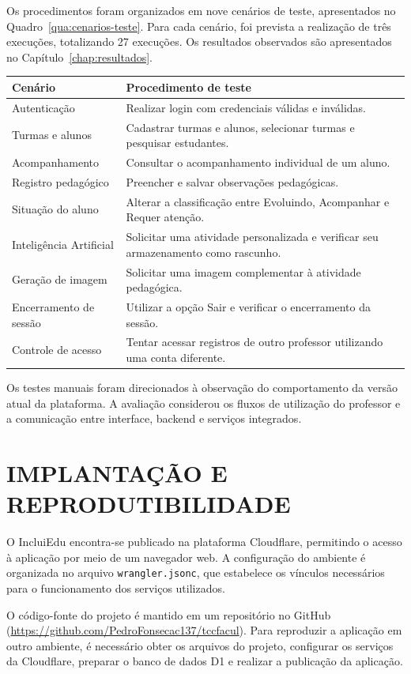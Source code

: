 Os procedimentos foram organizados em nove cenários de teste, apresentados no Quadro~\ref{qua:cenarios-teste}. Para cada cenário, foi prevista a realização de três execuções, totalizando 27 execuções. Os resultados observados são apresentados no Capítulo~\ref{chap:resultados}.

\begin{quadro}[H]
\centering
\caption{Planejamento dos cenários de teste}
\label{qua:cenarios-teste}
\begin{tabular}{|l|p{10cm}|}
\hline
\textbf{Cenário} & \textbf{Procedimento de teste} \\
\hline
Autenticação & Realizar login com credenciais válidas e inválidas. \\
\hline
Turmas e alunos & Cadastrar turmas e alunos, selecionar turmas e pesquisar estudantes. \\
\hline
Acompanhamento & Consultar o acompanhamento individual de um aluno. \\
\hline
Registro pedagógico & Preencher e salvar observações pedagógicas. \\
\hline
Situação do aluno & Alterar a classificação entre Evoluindo, Acompanhar e Requer atenção. \\
\hline
Inteligência Artificial & Solicitar uma atividade personalizada e verificar seu armazenamento como rascunho. \\
\hline
Geração de imagem & Solicitar uma imagem complementar à atividade pedagógica. \\
\hline
Encerramento de sessão & Utilizar a opção Sair e verificar o encerramento da sessão. \\
\hline
Controle de acesso & Tentar acessar registros de outro professor utilizando uma conta diferente. \\
\hline
\end{tabular}
\end{quadro}

Os testes manuais foram direcionados à observação do comportamento da versão atual da plataforma. A avaliação considerou os fluxos de utilização do professor e a comunicação entre interface, backend e serviços integrados.

\section{IMPLANTAÇÃO E REPRODUTIBILIDADE}

O IncluiEdu encontra-se publicado na plataforma Cloudflare, permitindo o acesso à aplicação por meio de um navegador web. A configuração do ambiente é organizada no arquivo \texttt{wrangler.jsonc}, que estabelece os vínculos necessários para o funcionamento dos serviços utilizados.

O código-fonte do projeto é mantido em um repositório no GitHub (\url{https://github.com/PedroFonsecac137/tccfacul}). Para reproduzir a aplicação em outro ambiente, é necessário obter os arquivos do projeto, configurar os serviços da Cloudflare, preparar o banco de dados D1 e realizar a publicação da aplicação.